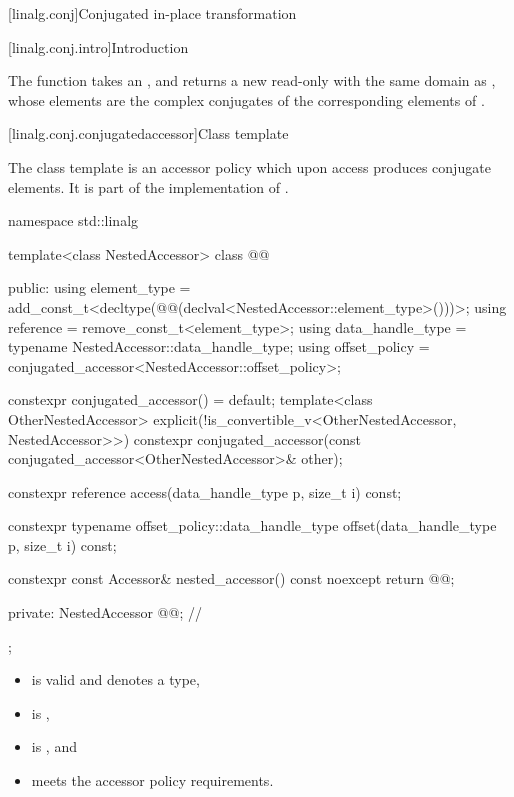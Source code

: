 [linalg.conj]{Conjugated in-place transformation}

[linalg.conj.intro]{Introduction}

\pnum
The  function takes an  ,
and returns a new read-only  
with the same domain as ,
whose elements are the complex conjugates
of the corresponding elements of .

[linalg.conj.conjugatedaccessor]{Class template }

\pnum
The class template 
is an  accessor policy
which upon access produces conjugate elements.
It is part of the implementation of
.

\begin{codeblock}
namespace std::linalg {
  template<class NestedAccessor>
  class @@ {
  public:
    using element_type =
      add_const_t<decltype(@@(declval<NestedAccessor::element_type>()))>;
    using reference = remove_const_t<element_type>;
    using data_handle_type = typename NestedAccessor::data_handle_type;
    using offset_policy = conjugated_accessor<NestedAccessor::offset_policy>;

    constexpr conjugated_accessor() = default;
    template<class OtherNestedAccessor>
      explicit(!is_convertible_v<OtherNestedAccessor, NestedAccessor>>)
      constexpr conjugated_accessor(const conjugated_accessor<OtherNestedAccessor>& other);

    constexpr reference access(data_handle_type p, size_t i) const;

    constexpr typename offset_policy::data_handle_type
      offset(data_handle_type p, size_t i) const;

    constexpr const Accessor& nested_accessor() const noexcept { return @@; }

  private:
    NestedAccessor @@{};                           // \expos
  };
}
\end{codeblock}

\pnum
\mandates
\begin{itemize}
\item
{} is valid and denotes a type,
\item
{} is ,
\item
{} is , and
\item
{} meets the accessor policy requirements.
\end{itemize}


